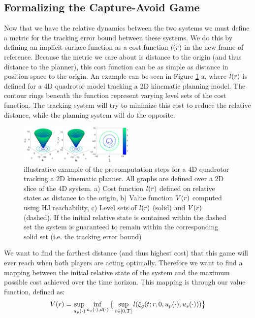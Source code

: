 \subsection{Formalizing the Capture-Avoid Game}
Now that we have the relative dynamics between the two systems we must define a metric for the tracking error bound between these systems. We do this by defining an implicit surface function as a cost function $l(r)$ in the new frame of reference. Because the metric we care about is distance to the origin (and thus distance to the planner), this cost function can be as simple as distance in position space to the origin. An example can be seen in Figure \ref{fig:quad4D_example}-a, where $l(r)$ is defined for a 4D quadrotor model tracking a 2D kinematic planning model. The contour rings beneath the function represent varying level sets of the cost function. The tracking system will try to minimize this cost to reduce the relative distance, while the planning system will do the opposite.

\begin{figure}
	\centering
	\includegraphics[width=0.5\textwidth]{fig/quad4D_example}
	\caption{illustrative example of the precomputation steps for a 4D quadrotor tracking a 2D kinematic planner. All graphs are defined over a 2D slice of the 4D system. a) Cost function $l(r)$ defined on relative states as distance to the origin, b) Value function $V(r)$ computed using HJ reachability, c) Level sets of $l(r)$ (solid) and $V(r)$ (dashed). If the initial relative state is contained within the dashed set the system is guaranteed to remain within the corresponding solid set (i.e. the tracking error bound)}
	\label{fig:quad4D_example}
\end{figure} 
 
 We want to find the farthest distance (and thus highest cost) that this game will ever reach when both players are acting optimally. Therefore we want to find a mapping between the initial relative state of the system and the maximum possible cost achieved over the time horizon. This mapping is through our value function, defined as: 
 \begin{equation}
 \begin{aligned}
 \label{eq:valfunc}
 	V(r)= \sup_{u_p(\cdot)} \inf_{u_s(\cdot), d(\cdot)} \big\{\sup_{t\in [0, T]} l(\xi_g(t; r, 0, u_p(\cdot), u_s(\cdot)))\big\}
 	\end{aligned}
 \end{equation} 
 
